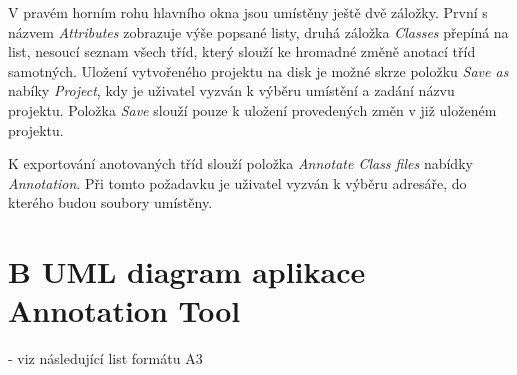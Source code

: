 \documentclass{projekt}
\begin{document}
\thispagestyle{plain}

V pravém horním rohu hlavního okna jsou umístěny ještě dvě záložky. První s názvem {\it Attributes} zobrazuje výše popsané listy, druhá záložka {\it Classes} přepíná na list, nesoucí seznam všech tříd, který slouží ke hromadné změně anotací tříd samotných. 
Uložení vytvořeného projektu na disk je možné skrze položku {\it Save as} nabíky {\it Project}, kdy je uživatel vyzván k výběru umístění a zadání názvu projektu. Položka {\it Save} slouží pouze k uložení provedených změn v již uloženém projektu.


K exportování anotovaných tříd slouží položka {\it Annotate Class files} nabídky {\it Annotation}. Při tomto požadavku je uživatel vyzván k výběru adresáře, do kterého budou soubory umístěny.

\thispagestyle{plain}

\newpage
\thispagestyle{plain}
\section*{{\LARGE B} UML diagram aplikace Annotation Tool}
- viz následující list formátu A3

\newpage
\thispagestyle{empty}


\end{document}
